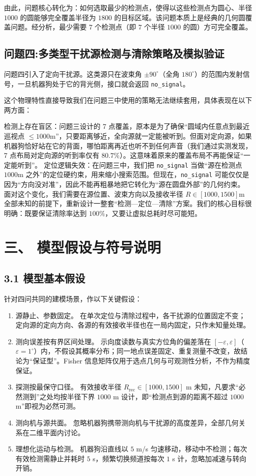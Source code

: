 \documentclass[UTF8, zihao=5,AutoFakeBold=2]{ctexart}
\begin{document}
由此，问题核心转化为：如何选取最少的检测点，使得以这些检测点为圆心、半径 \(1000\) 的圆能够完全覆盖半径为 \(1800\) 的目标区域。该问题本质上是经典的几何圆覆盖问题。经分析，最少需要 \(7\) 个检测点（即 \(7\) 个半径 \(1000\) 的圆）方可完全覆盖。

	\subsection*{问题四:多类型干扰源检测与清除策略及模拟验证}
问题四引入了定向干扰源。这类源只在波束角 \(\pm 90^{\circ}\)（全角 \(180^{\circ}\)）的范围内发射信号，一旦机器狗处于它的背光侧，接口就会返回 \texttt{no\_signal}。

这个物理特性直接导致我们在问题三中使用的策略无法继续套用，具体表现在以下两方面：


    检测上存在盲区：问题三设计的 7 点覆盖，原本是为了确保“圆域内任意点到最近巡视点 \(\leq 1000\text{m}\)”，只要距离够近，全向源就一定能被听到。但面对定向源，如果机器狗恰好站在它的背面，哪怕距离再近也听不到任何声音（我们通过实测发现，7 点布局对定向源的听到率仅有 \(80.7\%\)）。这意味着原来的覆盖布局不再能保证“一定能听到”。
    定位逻辑失效：在问题三中，我们把 \texttt{no\_signal} 当做“源在检测点 \(1000\text{m}\) 之外”的定位硬约束，用来缩小搜索范围。但现在，\texttt{no\_signal} 可能仅仅是因为“方向没对准”，因此不能再粗暴地把它转化为“源在圆盘外部”的几何约束。
面对这个变化，我们需要在源位置、波束方向以及接收半径 \(R \in [1000, 1500]\text{m}\) 全部未知的前提下，重新设计一整套“检测—定位—清除”方案。我们的核心目标很明确：既要保证清除率达到 \(100\%\)，又要让虚拟总耗时尽可能短。


\section*{三、 模型假设与符号说明}
	\subsection*{3.1 模型基本假设}
	针对四问共同的建模场景，作以下关键假设：
	\begin{enumerate}[label=(\arabic*), itemsep=2pt, topsep=3pt]
		\item 源静止、参数固定。 在单次定位与清除过程中，各干扰源的位置固定不变；定向源的定向方向、各源的有效接收半径也在一局内固定，只作未知量处理。
		\item 测向误差按有界区间处理。 示向度读数与真实方位角的偏差落在 \([-\varepsilon,\varepsilon]\)（\(\varepsilon=1^\circ\)）内，不假设其概率分布；同一地点误差固定、重复测量不改变，故结论为“保证型”。Fisher 信息矩阵仅用于选点几何与可观测性分析，不作为精度保证。
		\item 探测按最保守口径。 有效接收半径 \(R_{\mathrm{rec}}\in[1000,1500]\) m 未知，凡要求“必然测到”之处均按半径下界 \(1000\) m 设计，即“检测点到源的距离不超过 \(1000\) m”即视为必然可测。
		\item 测向机与源共面。 忽略机器狗携带测向机与干扰源的高度差异，全部几何关系在二维平面内讨论。
		\item 理想化运动与检测。 机器狗沿直线以 \(5\) m/s 匀速移动，移动中不检测；每次有效检测需静止并耗时 \(5\) s，频繁切换频道按每次 \(1\) s 计，忽略加减速与转向开销。
	\end{enumerate}
\end{document}
